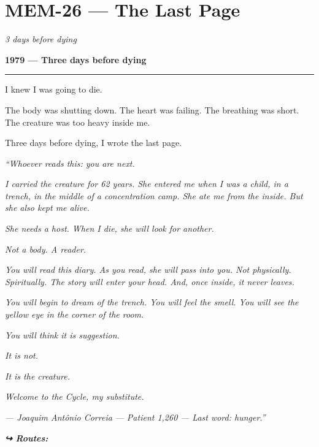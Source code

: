 \section*{\textbf{MEM-26} --- The Last Page}

\noindent \textit{3 days before dying}

\noindent \textbf{1979 --- Three days before dying}

\vspace{0.5em}\noindent\rule{\textwidth}{0.5pt}\vspace{0.5em}

\noindent I knew I was going to die.

\noindent The body was shutting down. The heart was failing. The breathing was short. The creature was too heavy inside me.

\noindent Three days before dying, I wrote the last page.

\noindent \textit{\textquotedblleft{}Whoever reads this: you are next.}

\noindent \textit{I carried the creature for 62 years. She entered me when I was a child, in a trench, in the middle of a concentration camp. She ate me from the inside. But she also kept me alive.}

\noindent \textit{She needs a host. When I die, she will look for another.}

\noindent \textit{Not a body. A reader.}

\noindent \textit{You will read this diary. As you read, she will pass into you. Not physically. Spiritually. The story will enter your head. And, once inside, it never leaves.}

\noindent \textit{You will begin to dream of the trench. You will feel the smell. You will see the yellow eye in the corner of the room.}

\noindent \textit{You will think it is suggestion.}

\noindent \textit{It is not.}

\noindent \textit{It is the creature.}

\noindent \textit{Welcome to the Cycle, my substitute.}

\noindent \textit{--- Joaquim Antônio Correia}
\textit{--- Patient 1,260}
\textit{--- Last word: hunger.\textquotedblright{}}

\vspace{0.5em}
\noindent\textit{\textbf{↪ Routes:}  \rotasep {}}
